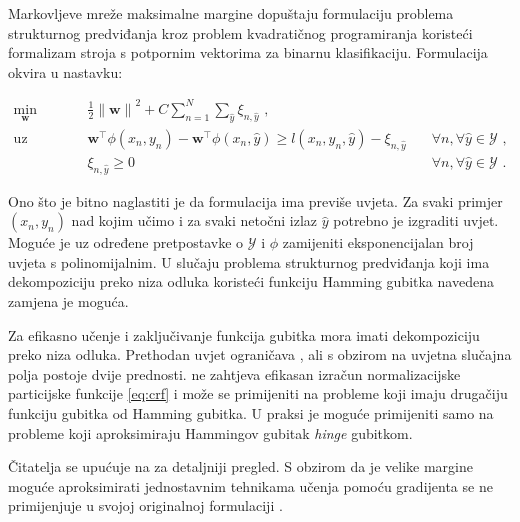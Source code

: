Markovljeve mreže maksimalne margine  dopuštaju formulaciju problema strukturnog predviđanja kroz
problem kvadratičnog programiranja  koristeći
formalizam stroja s potpornim vektorima za binarnu klasifikaciju. Formulacija \mmmm{} okvira u nastavku:

\begin{equation}\label{eq:mmmm}
\begin{aligned}
  \min_{\mathbf{w}} & \quad \frac{1}{2} {\lVert\mathbf{w}\lVert}^2 + C \sum_{n=1}^{N}\sum_{\hat{y}} \xi_{n,\hat{y}} \text{ ,}              & \\
  \text{uz uvjete}  & \quad \mathbf{w}^\top \phi(x_n, y_n) - \mathbf{w}^\top \phi(x_n, \hat{y}) \ge l(x_n, y_n, \hat{y}) - \xi_{n,\hat{y}} & \quad \forall n, \forall \hat{y} \in \mathcal{Y} \text{ ,}\\
                    & \quad \xi_{n,\hat{y}} \ge 0                                                                                          & \quad \forall n, \forall \hat{y} \in \mathcal{Y} \text{ .}
\end{aligned}
\end{equation}

Ono što je bitno naglastiti je da \mmmm{} formulacija ima previše uvjeta. Za
svaki primjer $(x_n, y_n)$ nad kojim učimo i za svaki netočni izlaz $\hat{y}$
potrebno je izgraditi uvjet. Moguće je uz određene pretpostavke o $\mathcal{Y}$
i $\phi$ zamijeniti eksponencijalan broj uvjeta s polinomijalnim. U slučaju
problema strukturnog predviđanja koji ima dekompoziciju preko niza odluka
koristeći funkciju Hamming gubitka navedena zamjena je moguća.

Za efikasno učenje i zaključivanje funkcija gubitka mora imati dekompoziciju
preko niza odluka. Prethodan uvjet ograničava \mmmm{}, ali s obzirom na uvjetna
slučajna polja postoje dvije prednosti. \mmmm{} ne zahtjeva efikasan izračun
normalizacijske particijske funkcije \ref{eq:crf} i može se primijeniti na
probleme koji imaju drugačiju funkciju gubitka od Hamming gubitka. U praksi je
moguće primijeniti \mmmm{} samo na probleme koji aproksimiraju Hammingov gubitak
\textit{hinge} gubitkom.

Čitatelja se upućuje na \citep{taskar2003maximum} za detaljniji pregled. S
obzirom da je velike margine moguće aproksimirati jednostavnim tehnikama učenja
pomoću gradijenta \mmmm{} se ne primijenjuje u svojoj originalnoj formulaciji
\citep{daume2005learning, ratliff2006maximum}.
